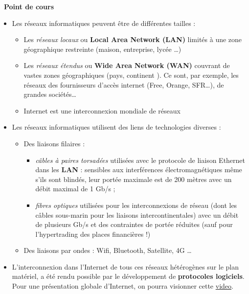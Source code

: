 \documentclass[
  11pt,
]{article}
\providecommand{\tightlist}{%
  \setlength{\itemsep}{0pt}\setlength{\parskip}{0pt}}
\newcounter{cours}
\newenvironment{cours}[1]
{\par \medskip   \addtocounter{cours}{1} \noindent  
\begin{bclogo}[arrondi =0.1,  ombre = true, barre=none, logo=\bcbook, marge=4]{~\textbf{Point de cours} \textbf{\thecours} {\itshape #1} }  \par}
{
\end{bclogo}
 \par \bigskip }
\newcounter{logi}
\begin{document}
\begin{cours}{}

\begin{itemize}
\tightlist
\item
  Les réseaux informatiques peuvent être de différentes tailles :

  \begin{itemize}
  \tightlist
  \item
    Les \emph{réseaux locaux} ou \textbf{Local Area Network (LAN)}
    limités à une zone géographique restreinte (maison, entreprise,
    lycée \ldots)
  \item
    Les \emph{réseaux étendus} ou \textbf{Wide Area Network (WAN)}
    couvrant de vastes zones géographiques (pays, continent ). Ce sont,
    par exemple, les réseaux des fournisseurs d'accès internet (Free,
    Orange, SFR\ldots), de grandes sociétés\ldots{}
  \item
    Internet est une interconnexion mondiale de réseaux
  \end{itemize}
\item
  Les réseaux informatiques utilisent des liens de technologies diverses
  :

  \begin{itemize}
  \tightlist
  \item
    Des liaisons filaires :

    \begin{itemize}
    \tightlist
    \item
      \emph{câbles à paires torsadées} utilisées avec le protocole de
      liaison Ethernet dans les \textbf{LAN} : sensibles aux
      interférences électromagnétiques même s'ils sont blindés, leur
      portée maximale est de 200 mètres avec un débit maximal de 1 Gb/s
      ;
    \item
      \emph{fibres optiques} utilisées pour les interconnexions de
      réseau (dont les câbles sous-marin pour les liaisons
      intercontinentales) avec un débit de plusieurs Gb/s et des
      contraintes de portée réduites (sauf pour l'hypertrading des
      places financières !)
    \end{itemize}
  \item
    Des liaisons par ondes : Wifi, Bluetooth, Satellite, 4G \ldots{}
  \end{itemize}
\item
  L'interconnexion dans l'Internet de tous ces réseaux hétérogènes sur
  le plan matériel, a été rendu possible par le développement de
  \textbf{protocoles logiciels}. Pour une présentation globale
  d'Internet, on pourra visionner cette
  \href{https://youtu.be/dCknqcjcItU}{video}.
\end{itemize}

\end{cours}
\end{document}
